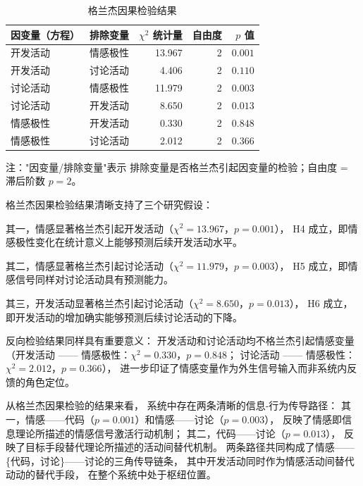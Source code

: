\documentclass[
    type = master, %
    degree = professional,        %
    decl-page,  %
    twoside,                %
    fontset = fandol %
  ]{njuthesis}
\renewcommand{\footnotesize}{\zihao{-5}}
\begin{document}
\begin{table}[htbp]
    \centering
    \small
    \caption{格兰杰因果检验结果}
    \label{tab:granger}
    \begin{tabularx}{\textwidth}{p{3.5cm}Xrrr}
        \toprule
        因变量（方程） & 排除变量 & $\chi^2$ 统计量 & 自由度 & $p$ 值 \\
        \midrule
        开发活动     & 情感极性 & 13.967 & 2 & $0.001$ \\
        开发活动     & 讨论活动   & 4.406  & 2 & $0.110$ \\
        讨论活动  & 情感极性 & 11.979 & 2 & $0.003$ \\
        讨论活动  & 开发活动      & 8.650  & 2 & $0.013$ \\
        情感极性 & 开发活动      & 0.330  & 2 & $0.848$ \\
        情感极性 & 讨论活动   & 2.012  & 2 & $0.366$ \\
        \bottomrule
    \end{tabularx}
    \begin{minipage}{\textwidth}
        \vspace{0.3em}
        \footnotesize 注："因变量/排除变量"表示
              排除变量是否格兰杰引起因变量的检验；自由度 = 滞后阶数 $p = 2$。
    \end{minipage}
\end{table}

格兰杰因果检验结果清晰支持了三个研究假设：

其一，情感显著格兰杰引起开发活动（$\chi^2 = 13.967$，$p = 0.001$），
H4 成立，即情感极性变化在统计意义上能够预测后续开发活动水平。

其二，情感显著格兰杰引起讨论活动（$\chi^2 = 11.979$，$p = 0.003$），
H5 成立，即情感信号同样对讨论活动具有预测能力。

其三，开发活动显著格兰杰引起讨论活动（$\chi^2 = 8.650$，$p = 0.013$），
H6 成立，即开发活动的增加确实能够预测后续讨论活动的下降。

反向检验结果同样具有重要意义：
开发活动和讨论活动均不格兰杰引起情感变量
（开发活动 —— 情感极性：$\chi^2 = 0.330$，$p = 0.848$；
讨论活动 —— 情感极性：$\chi^2 = 2.012$，$p = 0.366$），
进一步印证了情感变量作为外生信号输入而非系统内反馈的角色定位。

从格兰杰因果检验的结果来看，
系统中存在两条清晰的信息-行为传导路径：
其一，情感——代码（$p = 0.001$）和情感——讨论（$p = 0.003$），
反映了情感即信息理论所描述的情感信号激活行动机制；
其二，代码——讨论（$p = 0.013$），
反映了目标手段替代理论所描述的活动间替代机制。
两条路径共同构成了情感——\{代码，讨论\}——讨论的三角传导链条，
其中开发活动同时作为情感活动间替代动动的替代手段，
在整个系统中处于枢纽位置。
\end{document}
